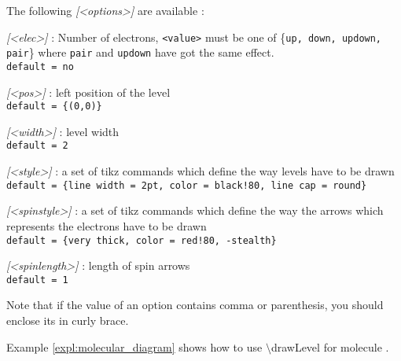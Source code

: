 \documentclass[10pt]{article}
\newcommand*{\cmd}[1]{{\ttfamily\color{blue!50!black}$\setminus$#1}\xspace}
\newcommand*{\opt}[1]{{\ttfamily\itshape\color{green!60!black}[<#1>]}\xspace}
\begin{document}
The following \opt{options} are available :
%
\begin{description}
    \item \opt{elec} : Number of electrons, \texttt{<value>} must be one of \{\texttt{up, down, updown, pair}\} where \texttt{pair} and \texttt{updown} have got the same effect.\\
    \texttt{default = no}
    
    \item \opt{pos} : left position of the level\\
    \texttt{default  = \{(0,0)\}}
    
    \item \opt{width} : level width\\
    \texttt{default = 2}    
    
    \item \opt{style} : a set of tikz commands which define the way levels have to be drawn\\
    \texttt{default = \{line width = 2pt, color = black!80, line cap = round\}}
    
    \item \opt{spinstyle} : a set of tikz commands which define the way the arrows which represents the electrons have to be drawn\\
    \texttt{default = \{very thick, color = red!80, -stealth\}}
    
    \item \opt{spinlength} : length of spin arrows \\
    \texttt{default = 1}
\end{description}

Note that if the value of an option contains comma or parenthesis, you should enclose its in curly brace.

Example \ref{expl:molecular_diagram} shows how to use \cmd{drawLevel} for molecule .
\end{document}
